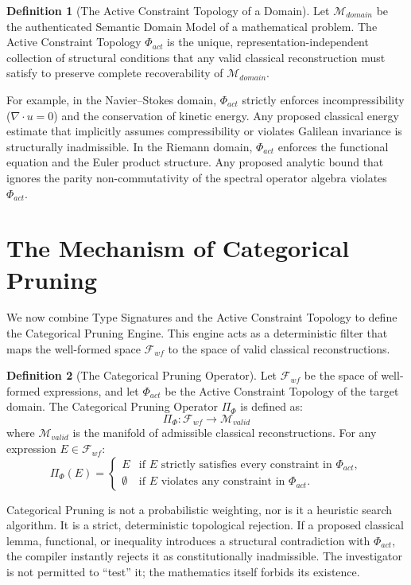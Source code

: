 \documentclass[12pt,openany]{extbook}
\theoremstyle{plain}
\theoremstyle{definition}
\newtheorem{definition}{Definition}[chapter]
\begin{document}
\begin{definition}[The Active Constraint Topology of a Domain]
Let $\mathcal{M}_{domain}$ be the authenticated Semantic Domain Model of a mathematical problem. The Active Constraint Topology $\Phi_{act}$ is the unique, representation-independent collection of structural conditions that any valid classical reconstruction must satisfy to preserve complete recoverability of $\mathcal{M}_{domain}$.
\end{definition}

For example, in the Navier--Stokes domain, $\Phi_{act}$ strictly enforces incompressibility ($\nabla \cdot u = 0$) and the conservation of kinetic energy. Any proposed classical energy estimate that implicitly assumes compressibility or violates Galilean invariance is structurally inadmissible. In the Riemann domain, $\Phi_{act}$ enforces the functional equation and the Euler product structure. Any proposed analytic bound that ignores the parity non-commutativity of the spectral operator algebra violates $\Phi_{act}$.

\section{The Mechanism of Categorical Pruning}

We now combine Type Signatures and the Active Constraint Topology to define the Categorical Pruning Engine. This engine acts as a deterministic filter that maps the well-formed space $\mathcal{F}_{wf}$ to the space of valid classical reconstructions.

\begin{definition}[The Categorical Pruning Operator]
Let $\mathcal{F}_{wf}$ be the space of well-formed expressions, and let $\Phi_{act}$ be the Active Constraint Topology of the target domain. The Categorical Pruning Operator $\Pi_{\Phi}$ is defined as:
\[
\Pi_{\Phi}: \mathcal{F}_{wf} \to \mathcal{M}_{valid}
\]
where $\mathcal{M}_{valid}$ is the manifold of admissible classical reconstructions. For any expression $E \in \mathcal{F}_{wf}$:
\[
\Pi_{\Phi}(E) = 
\begin{cases} 
E & \text{if } E \text{ strictly satisfies every constraint in } \Phi_{act}, \\
\emptyset & \text{if } E \text{ violates any constraint in } \Phi_{act}.
\end{cases}
\]
\end{definition}

Categorical Pruning is not a probabilistic weighting, nor is it a heuristic search algorithm. It is a strict, deterministic topological rejection. If a proposed classical lemma, functional, or inequality introduces a structural contradiction with $\Phi_{act}$, the compiler instantly rejects it as constitutionally inadmissible. The investigator is not permitted to ``test'' it; the mathematics itself forbids its existence.
\end{document}
